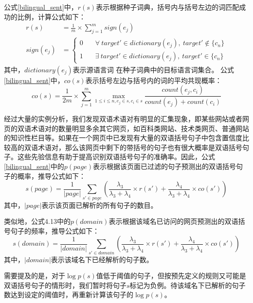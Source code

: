 公式\ref{bilingual_sent}中，$r(s)$表示根据种子词典，括号内与括号左边的词匹配成功的比例，计算公式如下：
\begin{equation}
\begin{aligned}
r(s) &= \frac{1}{m} \times \sum_{j=1}^{m} sign(e_j) \\
sign(e_j) & = \left \{
\begin{array}{ll}
0 & \quad \forall \ target' \in dictionary(e_j),\ target' \notin \{c_n\}  \\
1 & \quad \exists \ target' \in dictionary(e_j),\ target' \in \{c_n\}
\end{array}
\right.
\end{aligned}
\end{equation}
其中，$dictionary(e_j)$表示源语言词 在种子词典中的目标语言词集合。
公式\ref{bilingual_sent}中，$co(s)$表示括号左边与括号内的词的平均共现概率：
\begin{equation}
co(s) = \frac{1}{2m} \times \sum_{j=1}^{m} \max_{1\le i \le n, e_j \in s, c_i \in s} \frac{count(e_j, c_i)}{count(e_j)+count(c_i)}
\end{equation}

经过大量的实例分析，我们发现双语术语对有明显的汇集现象，即某些网站或者网页的双语术语对的数量明显多余其它网页，如百科类网站、技术类网页、普通网站的知识性栏目等。如果在一个网页中已发现有大量的双语括号句子中包含置信度比较高的双语术语对，那么该网页中剩下的带括号的句子也有很大概率是双语括号句子。这些先验信息有助于提高识别双语括号句子的准确率。因此，公式\ref{bilingual_sent}中的$p(page)$表示根据该页面已过滤的句子预测出的双语括号句子的概率，推导公式如下：
\begin{equation}
s(page) = \frac{1}{|page|} \sum_{s'\in page}\left( \frac{\lambda_3}{\lambda_3 + \lambda_4}\times r(s') + \frac{\lambda_4}{\lambda_3 + \lambda_4}\times co(s') \right)
\end{equation}
其中，$|page|$表示该页面已解析的所有句子的数目。

类似地，公式4.13中的$p(domain)$表示根据该域名已访问的网页预测出的双语括号句子的频率，推导公式如下：
\begin{equation}
s(domain) = \frac{1}{|domain|} \sum_{s'\in domain}\left( \frac{\lambda_3}{\lambda_3 + \lambda_4}\times r(s') + \frac{\lambda_4}{\lambda_3 + \lambda_4}\times co(s') \right)
\end{equation}
其中，$|domain|$表示该域名下已经解析的句子数。

需要提及的是，对于$\log p(s)$值低于阈值的句子，但按预先定义的规则又可能是双语括号句子的情形时，我们暂时将句子$s$标记为负例。待该域名下已解析的句子数达到设定的阈值时，再重新计算该句子的$\log p(s)$。

